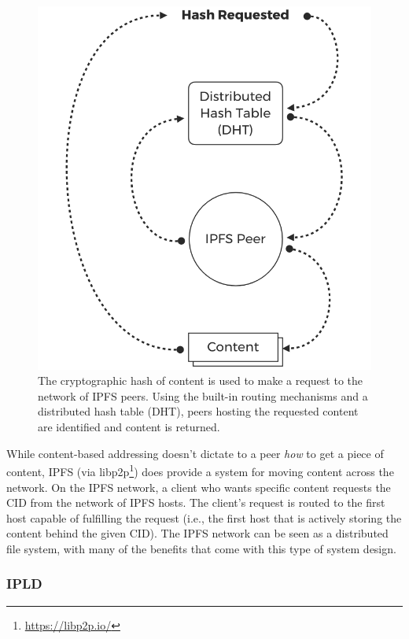 \documentclass{textile}
\begin{document}
\begin{figure}
  \includegraphics[width=\linewidth]{figures/Hash_Request.png}
  \caption{The cryptographic hash of content is used to make a request to the network of IPFS peers. Using the built-in routing mechanisms and a distributed hash table (DHT), peers hosting the requested content are identified and content is returned.}
  \label{fig:contentaddressing}
\end{figure}

While content-based addressing doesn't dictate to a peer \emph{how} to get a piece of content, IPFS (via libp2p\footnote{\url{https://libp2p.io/}}) does provide a system for moving content across the network.  On the IPFS network, a client who wants specific content requests the CID from the network of IPFS hosts. The client's request is routed to the first host capable of fulfilling the request (i.e., the first host that is actively storing the content behind the given CID). The IPFS network can be seen as a distributed file system, with many of the benefits that come with this type of system design.

\subsubsection{IPLD}
\end{document}
